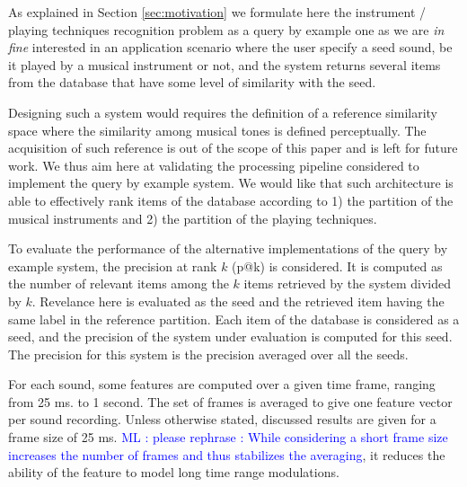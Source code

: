 \documentclass{article}
\newcommand{\ml}[1]{\textcolor{blue}{ML : #1}}
\begin{document}
As explained in Section \ref{sec:motivation} we formulate here the instrument / playing techniques recognition problem as a query by example one as we are \textit{in fine} interested in an application scenario where the user specify a seed sound, be it played by a musical instrument or not, and the system returns several items from the database that have some level of similarity with the seed.

Designing such a system would requires the definition of a reference similarity space where the similarity among musical tones is defined perceptually. The acquisition of such reference is out of the scope of this paper and is left for future work. We thus aim here at validating the processing pipeline considered to implement the query by example system. We would like that such architecture is able to effectively rank items of the database according to 1) the partition of the musical instruments and 2) the partition of the playing techniques.

To evaluate the performance of the alternative implementations of the query by example system, the precision at rank $k$ (p@k) is considered. It is computed as the number of relevant items among the $k$ items retrieved by the system divided by $k$. Revelance here is evaluated as the seed and the retrieved item having the same label in the reference partition. Each item of the database is considered as a seed, and the precision of the system under evaluation is computed for this seed. The precision for this system is the precision averaged over all the seeds.


For each sound, some features are computed over a given time frame, ranging from 25 ms. to 1 second. The set of frames is averaged to give one feature vector per sound recording. Unless otherwise stated, discussed results are given for a frame size of 25 ms. \ml{please rephrase : While considering a short frame size increases the number of frames and thus stabilizes the averaging}, it reduces the ability of the feature to model long time range modulations.
\end{document}
